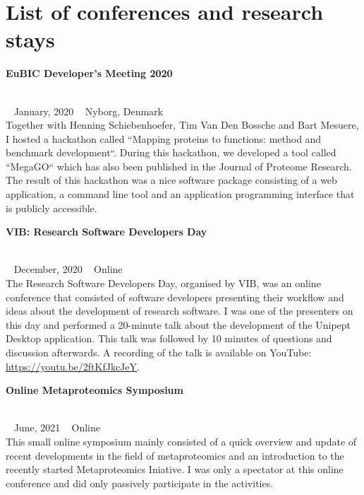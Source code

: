 \chapter*{List of conferences and research stays}

\begin{large}\textbf{\textsf{EuBIC Developer's Meeting 2020}}\end{large} \\
\faCalendar ~ \textsf{January, 2020} \hfill \faGlobe ~ \textsf{Nyborg, Denmark} \\
Together with Henning Schiebenhoefer, Tim Van Den Bossche and Bart Mesuere, I hosted a hackathon called ``Mapping proteins to functions: method and benchmark development``.
During this hackathon, we developed a tool called ``MegaGO`` which has also been published in the Journal of Proteome Research.
The result of this hackathon was a nice software package consisting of a web application, a command line tool and an application programming interface that is publicly accessible.

\begin{large}\textbf{\textsf{VIB: Research Software Developers Day}}\end{large} \\
\faCalendar ~ \textsf{December, 2020} \hfill \faGlobe ~ \textsf{Online} \\
The Research Software Developers Day, organised by VIB, was an online conference that consisted of software developers presenting their workflow and ideas about the development of research software.
I was one of the presenters on this day and performed a 20-minute talk about the development of the Unipept Desktop application. This talk was followed by 10 minutes of questions and discussion afterwards.
A recording of the talk is available on YouTube: \href{https://youtu.be/2ftKfJkcJeY}{https://youtu.be/2ftKfJkcJeY}.

\begin{large}\textbf{\textsf{Online Metaproteomics Symposium}}\end{large} \\
\faCalendar ~ \textsf{June, 2021} \hfill \faGlobe ~ \textsf{Online} \\
This small online symposium mainly consisted of a quick overview and update of recent developments in the field of metaproteomics and an introduction to the recently started Metaproteomics Iniative.
I was only a spectator at this online conference and did only passively participate in the activities.

